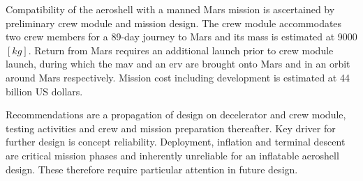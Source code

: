 Compatibility of the aeroshell with a manned Mars mission is ascertained by preliminary crew module and mission design. The crew module accommodates two crew members for a 89-day journey to Mars and its mass is estimated at 9000 $ \left[ kg \right] $. Return from Mars requires an additional launch prior to crew module launch, during which the \acrlong{mav} and an \acrlong{erv} are brought onto Mars and in an orbit around Mars respectively. Mission cost including development is estimated at 44 billion US dollars.

Recommendations are a propagation of design on decelerator and crew module, testing activities and crew and mission preparation thereafter. Key driver for further design is concept reliability. Deployment, inflation and terminal descent are critical mission phases and inherently unreliable for an inflatable aeroshell design. These therefore require particular attention in future design.


